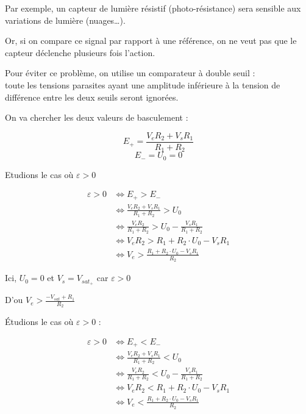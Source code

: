 Par exemple, un capteur de lumière résistif (photo-résistance) sera sensible aux variations de lumière (nuages…). \\


Or, si on compare ce signal par rapport à une référence, on ne veut pas que le capteur déclenche plusieurs fois l’action.


Pour éviter ce problème, on utilise un comparateur à double seuil : \\
toute les tensions parasites ayant une amplitude inférieure à la tension de différence entre les deux seuils seront ignorées.\\


On va chercher les deux valeurs de basculement : 

$$E_+ = \frac{V_eR_2 + V_s R_1}{R_1 + R_2}$$
$$E_- = U_0=0$$

Etudions le cas où $\varepsilon>0$

\begin{align}
\varepsilon>0 & \Leftrightarrow E_+ > E_-\\
& \Leftrightarrow \frac{V_eR_2 + V_s R_1}{R_1 + R_2} > U_0 \\
& \Leftrightarrow \frac{V_eR_2}{R_1 + R_2} > U_0 -  \frac{V_s R_1 }{R_1 + R_2} \\
& \Leftrightarrow  V_eR_2 > R_1 + R_2 \cdot  U_0 -  V_s R_1 \\
& \Leftrightarrow  V_e > \frac{R_1 + R_2 \cdot  U_0 -  V_s R_1}{R_2}
\end{align}

Ici, $U_0=0$ et $V_s=V_{sat_+}$ car $\varepsilon>0$

D'ou $V_e > \frac{-V_{sat} + R_1}{R_2}$




Étudions le cas où $\varepsilon>0$ : 

\begin{align}
\varepsilon>0 & \Leftrightarrow E_+ < E_-\\
& \Leftrightarrow \frac{V_eR_2 + V_s R_1}{R_1 + R_2} < U_0 \\
& \Leftrightarrow  \frac{V_eR_2}{R_1 + R_2} < U_0 -  \frac{V_s R_1 }{R_1 + R_2} \\
& \Leftrightarrow  V_eR_2 < R_1 + R_2 \cdot  U_0 -  V_s R_1 \\
& \Leftrightarrow  V_e < \frac{R_1 + R_2 \cdot  U_0 -  V_s R_1}{R_2}
\end{align}

